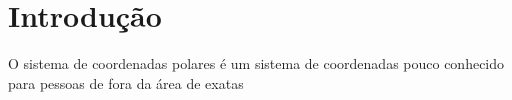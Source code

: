 \documentclass[a4paper, 12pt]{article}
\begin{document}
\maketitle

\section{Introdução}

O sistema de coordenadas polares é um sistema de coordenadas pouco conhecido para pessoas de fora da área de exatas
\end{document}
